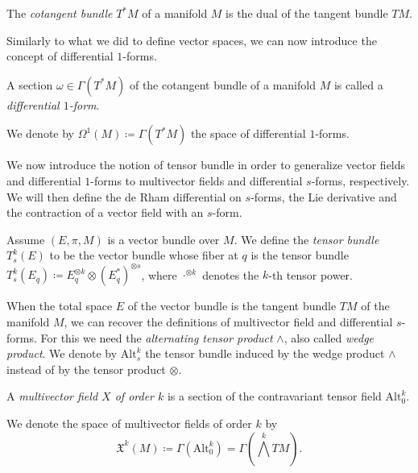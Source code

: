 \begin{definition}
    The \emph{cotangent bundle} $T^*M$ of a manifold $M$ is the dual of the tangent bundle $TM$.
\end{definition}

Similarly to what we did to define vector spaces, we can now introduce the concept of differential $1$-forms.

\begin{definition}
    A section $\omega \in \Gamma(T^*M)$ of the cotangent bundle of a manifold $M$ is called a \emph{differential $1$-form}.
\end{definition}

We denote by $\Omega^1(M) \coloneqq \Gamma(T^*M)$ the space of differential $1$-forms.

We now introduce the notion of tensor bundle in order to generalize vector fields and differential $1$-forms to multivector fields and differential $s$-forms, respectively.
We will then define the de Rham differential on $s$-forms, the Lie derivative and the contraction of a vector field with an $s$-form.

\begin{definition}
    Assume $(E, \pi, M)$ is a vector bundle over $M$.
    We define the \emph{tensor bundle} $T_s ^k (E)$ to be the vector bundle whose fiber at $q$ is the tensor bundle $T_s ^k (E_q) \coloneqq E_q ^{\otimes k} \otimes (E_q ^*) ^{\otimes s}$, where $\cdot^{\otimes k}$ denotes the $k$-th tensor power.
\end{definition}

When the total space $E$ of the vector bundle is the tangent bundle $TM$ of the manifold $M$, we can recover the definitions of multivector field and differential $s$-forms.
For this we need the \emph{alternating tensor product} $\wedge$, also called \emph{wedge product}.
We denote by $\text{Alt}_s ^k$ the tensor bundle induced by the wedge product $\wedge$ instead of by the tensor product $\otimes$.

\begin{definition}
    A \emph{multivector field $X$ of order $k$} is a section of the contravariant tensor field $\text{Alt}_0 ^k$.
\end{definition}

We denote the space of multivector fields of order $k$ by
\begin{equation*}
    \mathfrak{X}^k(M) \coloneqq \Gamma(\text{Alt}_0 ^k) = \Gamma \left( \bigwedge ^k TM \right).
\end{equation*}


